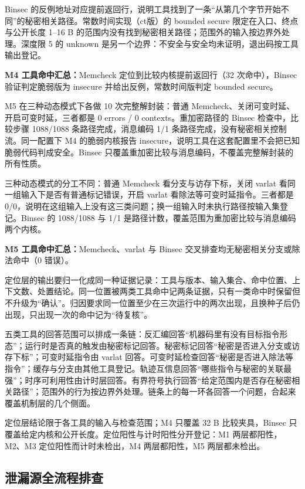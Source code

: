 Binsec 的反例地址对应提前返回行，说明工具找到了一条“从第几个字节开始不同”的秘密相关路径。常数时间实现（ct版）的 bounded secure 限定在入口、终点与公开长度 1--16 B 的范围内没有找到秘密相关路径；范围外的输入按边界外处理。深度限 5 的 unknown 是另一个边界：不安全与安全均未证明，退出码按工具输出登记。

\par\smallskip\noindent\textbf{M4 工具命中汇总：}Memcheck 定位到比较内核提前返回行（32 次命中），Binsec 验证判定脆弱版为 insecure 并给出反例，常数时间版判定 bounded secure。

M5 在三种动态模式下各做 10 次完整解封装：普通 Memcheck、关闭可变时延、开启可变时延，三者都是 0 errors / 0 contexts。重加密路径的 Binsec 检查中，比较步骤 1088/1088 条路径完成，消息编码 1/1 条路径完成，没有秘密相关控制流。同一配置下 M4 的脆弱内核报告 insecure，说明工具在这套配置里不会把已知脆弱代码判成安全。Binsec 只覆盖重加密比较与消息编码，不覆盖完整解封装的所有性质。%

三种动态模式的分工不同：普通 Memcheck 看分支与访存下标，关闭 varlat 看同一组输入下是否有普通标记错误，开启 varlat 看除法等可变时延指令。三者都是 0/0，说明在这组输入上没有这三类问题；换一组输入时未执行路径按输入集登记。Binsec 的 1088/1088 与 1/1 是路径计数，覆盖范围为重加密比较与消息编码两个内核。

\par\smallskip\noindent\textbf{M5 工具命中汇总：}Memcheck、varlat 与 Binsec 交叉排查均无秘密相关分支或除法命中（0 错误）。

定位层的输出要归一化成同一种证据记录：工具与版本、输入集合、命中位置、上下文数、处置结论。同一位置被两类工具命中记两条证据，只有一类命中时保留但不升级为“确认”。归因要求同一位置至少在三次运行中的两次出现，且换种子后仍出现，只出现一次的命中记为“待复核”。

五类工具的回答范围可以排成一条链：反汇编回答“机器码里有没有目标指令形态”；运行时是否真的触发由秘密标记回答。秘密标记回答“秘密是否进入分支或访存下标”；可变时延指令由 varlat 回答。可变时延检查回答“秘密是否进入除法等指令”；缓存与分支由其他工具登记。轨迹互信息回答“哪些指令与秘密的关联最强”；时序可利用性由计时层回答。有界符号执行回答“给定范围内是否存在秘密相关路径”；范围外的行为按边界外处理。链条上的每一环各回答一个问题，合起来覆盖机制层的几个侧面。

定位层结论限于各工具的输入与检查范围；M4 只覆盖 32 B 比较夹具，Binsec 只覆盖给定内核和公开长度。定位阳性与计时阳性分开登记：M1 两层都阳性，M2、M3 定位阳性而计时未检出，M4 两层都阳性，M5 两层都未检出。

\subsection{泄漏源全流程排查}

